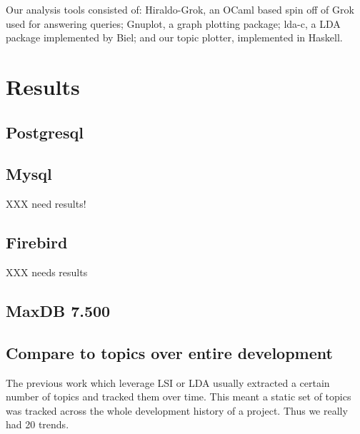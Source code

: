 \documentclass[times, 10pt,twocolumn]{article}
\begin{document}
Our analysis tools consisted of: Hiraldo-Grok, an OCaml based spin off
of Grok used for answering queries; Gnuplot, a graph plotting package;
lda-c, a LDA package implemented by Biel; and our topic plotter,
implemented in Haskell.















\section{Results}
\subsection{Postgresql}
\subsection{Mysql}

XXX need results! 

\subsection{Firebird}

XXX needs results

\subsection{MaxDB 7.500}


\subsection{Compare to topics over entire development}

The previous work which leverage LSI or LDA usually extracted a
certain number of topics and tracked them over time. This meant a
static set of topics was tracked across the whole development history
of a project. Thus we really had 20 trends. 
\end{document}
